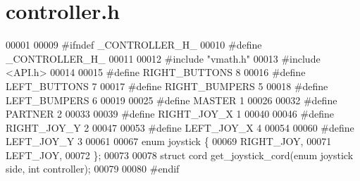 \section{controller.\+h}
\label{controller_8h_source}

\begin{DoxyCode}
00001 
00009 \textcolor{preprocessor}{#ifndef \_CONTROLLER\_H\_}
00010 \textcolor{preprocessor}{#define \_CONTROLLER\_H\_}
00011 
00012 \textcolor{preprocessor}{#include "vmath.h"}
00013 \textcolor{preprocessor}{#include <API.h>}
00014 
00015 \textcolor{preprocessor}{#define RIGHT\_BUTTONS 8}
00016 \textcolor{preprocessor}{#define LEFT\_BUTTONS 7}
00017 \textcolor{preprocessor}{#define RIGHT\_BUMPERS 5}
00018 \textcolor{preprocessor}{#define LEFT\_BUMPERS 6}
00019 
00025 \textcolor{preprocessor}{#define MASTER 1}
00026 
00032 \textcolor{preprocessor}{#define PARTNER 2}
00033 
00039 \textcolor{preprocessor}{#define RIGHT\_JOY\_X 1}
00040 
00046 \textcolor{preprocessor}{#define RIGHT\_JOY\_Y 2}
00047 
00053 \textcolor{preprocessor}{#define LEFT\_JOY\_X 4}
00054 
00060 \textcolor{preprocessor}{#define LEFT\_JOY\_Y 3}
00061 
00067 \textcolor{keyword}{enum} joystick \{
00069   RIGHT_JOY,
00071   LEFT_JOY,
00072 \};
00073 
00078 \textcolor{keyword}{struct }cord get_joystick_cord(enum joystick side, int controller);
00079 
00080 \textcolor{preprocessor}{#endif}
\end{DoxyCode}
